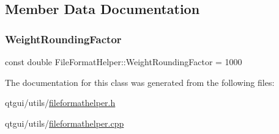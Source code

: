 \subsection{Member Data Documentation}
\mbox{\label{class_file_format_helper_a25058f5ac8d0b426355a007362f04100}} 
\subsubsection{\texorpdfstring{WeightRoundingFactor}{WeightRoundingFactor}}
{\footnotesize\ttfamily const double File\+Format\+Helper\+::\+Weight\+Rounding\+Factor = 1000\hspace{0.3cm}{\ttfamily [static]}}



The documentation for this class was generated from the following files\+:\begin{DoxyCompactItemize}
\item 
qtgui/utils/\mbox{\hyperlink{fileformathelper_8h}{fileformathelper.\+h}}\item 
qtgui/utils/\mbox{\hyperlink{fileformathelper_8cpp}{fileformathelper.\+cpp}}\end{DoxyCompactItemize}
